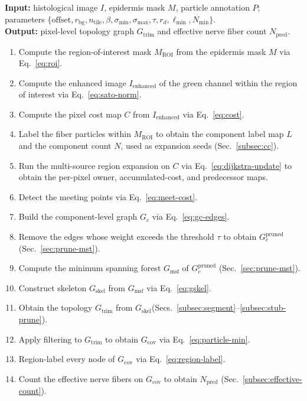 \begin{algorithm}[htbp]
  \caption{Annotation Expansion Linker}
  \label{alg:ael}
  \textbf{Input:} histological image $I$, epidermis mask $M$, particle annotation $P$; parameters $\{\text{offset}, r_{\text{bg}}, n_{\text{tile}}, \beta, \sigma_{\min}, \sigma_{\max}, \tau, r_d, \ell_{\min}, N_{\min}\}$.\\
  \textbf{Output:} pixel-level topology graph $G_{\text{trim}}$ and effective nerve fiber count $N_{\text{pred}}$.
  \begin{enumerate}
    \item Compute the region-of-interest mask $M_{\text{ROI}}$ from the epidermis mask $M$ via Eq.~\eqref{eq:roi}.
    \item Compute the enhanced image $I_{\text{enhanced}}$ of the green channel within the region of interest via Eq.~\eqref{eq:sato-norm}.
    \item Compute the pixel cost map $C$ from $I_{\text{enhanced}}$ via Eq.~\eqref{eq:cost}.
    \item Label the fiber particles within $M_{\text{ROI}}$ to obtain the component label map $L$ and the component count $N$, used as expansion seeds (Sec.~\ref{subsec:cc}).
    \item Run the multi-source region expansion on $C$ via Eq.~\eqref{eq:dijkstra-update} to obtain the per-pixel owner, accumulated-cost, and predecessor maps.
    \item Detect the meeting points via Eq.~\eqref{eq:meet-cost}.
    \item Build the component-level graph $G_c$ via Eq.~\eqref{eq:gc-edges}.
    \item Remove the edges whose weight exceeds the threshold $\tau$ to obtain $G_c^{\text{pruned}}$ (Sec.~\ref{sec:prune-mst}).
    \item Compute the minimum spanning forest $G_{\text{msf}}$ of $G_c^{\text{pruned}}$ (Sec.~\ref{sec:prune-mst}).
    \item Construct skeleton $G_{\text{skel}}$ from $G_{\text{msf}}$ via Eq.~\eqref{eq:gskel}.
    \item Obtain the topology $G_{\text{trim}}$ from $G_{\text{skel}}$(Secs.~\ref{subsec:segment}--\ref{subsec:stub-prune}).
    \item Apply filtering to $G_{\text{trim}}$ to obtain $G_{\text{cov}}$ via Eq.~\eqref{eq:particle-min}.
    \item Region-label every node of $G_{\text{cov}}$ via Eq.~\eqref{eq:region-label}.
    \item Count the effective nerve fibers on $G_{\text{cov}}$ to obtain $N_{\text{pred}}$ (Sec.~\ref{subsec:effective-count}).
  \end{enumerate}
\end{algorithm}


